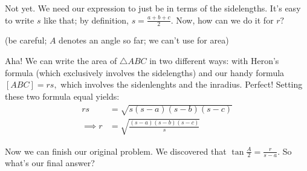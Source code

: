 






Not yet. We need our expression to just be in terms of the sidelengths. It's easy to write $s$ like that; by definition, $\displaystyle s = \frac{a+b+c}{2}.$ Now, how can we do it for $r?$

(be careful; $A$ denotes an angle so far; we can't use for area)




Aha! We can write the area of $\triangle ABC$ in two different ways: with Heron's formula (which exclusively involves the sidelengths) and our handy formula $[ABC] = rs,$ which involves the sidenlenghts and the inradius. Perfect! Setting these two formula equal yields:
\begin{align*} rs &= \sqrt{s(s-a)(s-b)(s-c)} \\ \implies r &= \sqrt{\frac{(s-a)(s-b)(s-c)}{s}} \end{align*}

Now we can finish our original problem. We discovered that $\displaystyle\tan\frac{A}{2} = \frac{r}{s-a}.$ So what's our final answer?

